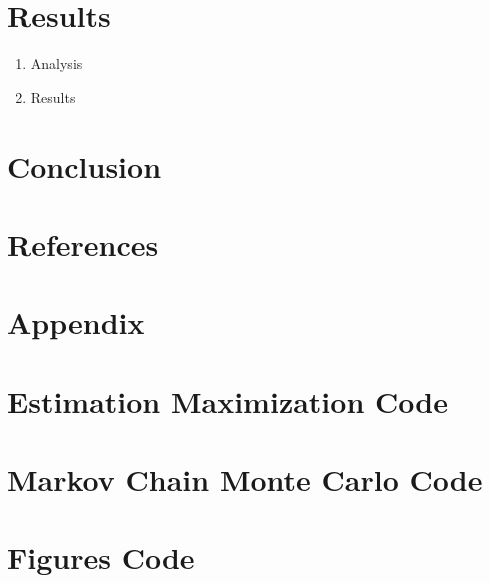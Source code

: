 \documentclass{article}
\begin{document}
\section{Results}
\begin{enumerate}
    \item Analysis
    \item Results
\end{enumerate}


\section{Conclusion}
\section{References}

\section*{Appendix}
\appendix 

\section{Estimation Maximization Code}
\section{Markov Chain Monte Carlo Code}
\section{Figures Code}
\end{document}
